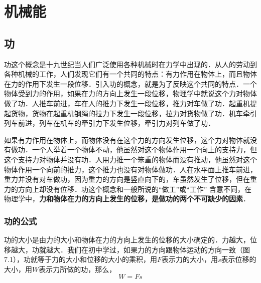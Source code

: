 \chapter{机械能}
\section{功}
功这个概念是十九世纪当人们广泛使用各种机械时在力学中出现的．从人的劳动到各种机械的工作，人们发现它们有一个共同的特点：有力作用在物体上，而且物体在力的作用下发生一段位移．引入功的概念，就是为了反映这个共同的特点．一个物体受到力的作用，如果在力的方向上发生一段位移，物理学中就说这个力对物体做了功．人推车前进，车在人的推力下发生一段位移，推力对车做了功．起重机提起货物，货物在起重机钢绳的拉力下发生一段位移，拉力对货物做了功．机车牵引列车前进，列车在机车的牵引力下发生位移，牵引力对列车做了功．

如果有力作用在物体上，而物体没有在这个力的方向发生位移，这个力对物体就没有做功．一个人举着一个物体不动，他虽然对这个物体作用一个向上的支持力，但这个支持力对物体并没有功．人用力推一个笨重的物体而没有推动，他虽然对这个物体作用一个向前的推力，这个推力也没有对物体做功．人在水平面上推车前进，重力并没有对车做功，因为重力的方向是竖直向下的，车虽然发生了位移，但在重力的方向上却没有位移．功这个概念和一般所说的“做工”或“工作”
含意不同，在物理学中，\textbf{力和物体在力的方向上发生的位移，是做功的两个不可缺少的因素}．

\subsection{功的公式}

功的大小是由力的大小和物体在力的方向上发生的位移的大小确定的．力越大，位移越大，功就越大．我们在初中学过，如果力的方向跟物体运动的方向一致（图7.1），功就等于力的大小和位移的大小的乘积，用$F$表示力的大小，用$s$表示位移的大小，用$W$表示力所做的功，那么，
\[W=Fs\]
\begin{figure}[H]
    \centering
    \caption{}
\end{figure}

